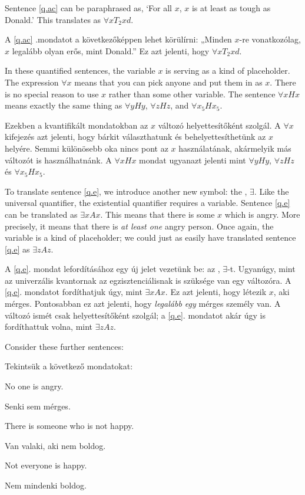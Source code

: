 Sentence \ref{q.ac} can be paraphrased as, `For all $x$, $x$ is at least as tough as Donald.' This translates as $\forall x T_2xd$.

A \ref{q.ac} .mondatot a következőképpen lehet körülírni: „Minden $x$-re vonatkozólag, $x$ legalább olyan erős, mint Donald.” Ez azt jelenti, hogy $\forall x T_2xd$.

In these quantified sentences, the variable $x$ is serving as a kind of placeholder. The expression $\forall x$ means that you can pick anyone and put them in as $x$. There is no special reason to use $x$ rather than some other variable. The sentence $\forall x Hx$ means exactly the same thing as $\forall y Hy$, $\forall z Hz$, and $\forall x_5 Hx_5$.

Ezekben a kvantifikált mondatokban az $x$ változó helyettesítőként szolgál. A $\forall x$ kifejezés azt jelenti, hogy bárkit választhatunk és behelyettesíthetünk az $x$ helyére. Semmi különösebb oka nincs pont az $x$ használatának, akármelyik más változót is használhatnánk. A $\forall x Hx$ mondat ugyanazt jelenti mint $\forall y Hy$, $\forall z Hz$ és $\forall x_5 Hx_5$.

To translate sentence \ref{q.e}, we introduce another new symbol: the , $\exists$. Like the universal quantifier, the existential quantifier requires a variable. Sentence \ref{q.e} can be translated as $\exists x Ax$. This means that there is some $x$ which is angry. More precisely, it means that there is \emph{at least one} angry person. Once again, the variable is a kind of placeholder; we could just as easily have translated sentence \ref{q.e} as $\exists z Az$.

A \ref{q.e}. mondat lefordításához egy új jelet vezetünk be: az , $\exists$-t. Ugyanúgy, mint az univerzális kvantornak az egzisztenciálisnak is szüksége van egy változóra. A \ref{q.e}. mondatot fordíthatjuk úgy, mint $\exists x Ax$. Ez azt jelenti, hogy létezik $x$, aki mérges. Pontosabban ez azt jelenti, hogy \emph{legalább egy} mérges személy van. A változó ismét csak helyettesítőként szolgál; a \ref{q.e}. mondatot akár úgy is fordíthattuk volna, mint $\exists z Az$.

Consider these further sentences:

Tekintsük a következő mondatokat:
\begin{earg}
\item[\ex{q.ne}] No one is angry.
\item[\ex{q.ne}] Senki sem mérges.
\item[\ex{q.en}] There is someone who is not happy.
\item[\ex{q.en}] Van valaki, aki nem boldog.
\item[\ex{q.na}] Not everyone is happy.
\item[\ex{q.na}] Nem mindenki boldog.
\end{earg}

